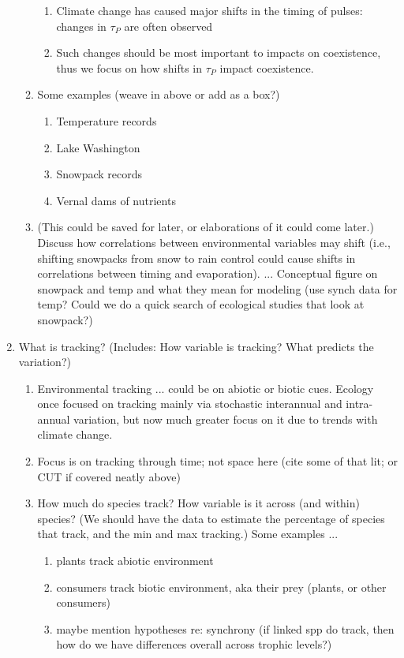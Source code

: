 \documentclass[11pt,letterpaper]{article}
\begin{document}
\begin{enumerate}
\begin{enumerate}
\begin{enumerate}
\item Climate change has caused major shifts in the timing of pulses: changes in $\tau_{P}$ are often observed 
\item Such changes should be most important to impacts on coexistence, thus we focus on how shifts in $\tau_{P}$ impact coexistence.
\end{enumerate}
\item Some examples (weave in above or add as a box?)
\begin{enumerate}
\item Temperature records
\item Lake Washington 
\item Snowpack records 
\item Vernal dams of nutrients
\end{enumerate}
\item (This could be saved for later, or elaborations of it could come later.) Discuss how correlations between environmental variables may shift (i.e., shifting snowpacks from snow to rain control could cause shifts in correlations between timing and evaporation). ... Conceptual figure on snowpack and temp and what they mean for modeling (use synch data for temp? Could we do a quick search of ecological studies that look at snowpack?) 
\end{enumerate}
\item What is tracking? (Includes: How variable is tracking? What predicts the variation?)
\begin{enumerate}
\item Environmental tracking ... could be on abiotic or biotic cues. Ecology once focused on tracking mainly via stochastic interannual and intra-annual variation, but now much greater focus on it due to trends with climate change. 
\item Focus is on tracking through time; not space here (cite some of that lit; or CUT if covered neatly above)
\item How much do species track? How variable is it across (and within) species? (We should have the data to estimate the
percentage of species that track, and the min and max tracking.) Some examples ...
\begin{enumerate}
\item plants track abiotic environment 
\item consumers track biotic environment, aka their prey (plants, or other consumers)
\item maybe mention hypotheses re: synchrony (if linked spp do track, then how do we have differences overall across trophic levels?)

\end{enumerate}
\end{enumerate}
\end{enumerate}
\end{document}
